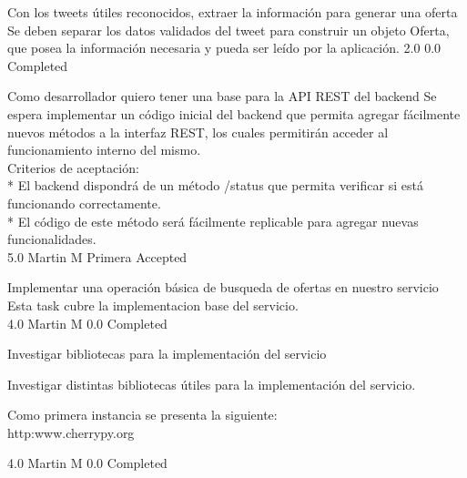 		{Con los tweets útiles reconocidos, extraer la información para generar una oferta} %
		{Se deben separar los datos validados del tweet para construir un objeto
Oferta, que posea la información necesaria y pueda ser leído por la
aplicación.
} %
		{2.0} %
		{} %
		{0.0} %
		{Completed} %


\vspace{20pt}

	{Como desarrollador quiero tener una base para la API REST del backend} %
	{Se espera implementar un código inicial del backend que permita agregar
fácilmente nuevos métodos a la interfaz REST, los cuales permitirán acceder al
funcionamiento interno del mismo.
  \\
Criterios de aceptación:\\
* El backend dispondrá de un método /status que permita verificar si está funcionando correctamente.   \\
* El código de este método será fácilmente replicable para agregar nuevas funcionalidades.\\
} %
	{} %
	{5.0} %
	{Martin M} %
	{Primera} %
	{Accepted} %

		{Implementar una operación básica de busqueda de ofertas en nuestro servicio} %
		{Esta task cubre la implementacion base del servicio.\\
} %
		{4.0} %
		{Martin M} %
		{0.0} %
		{Completed} %

		{Investigar bibliotecas para la implementación del servicio} %
		{Investigar distintas bibliotecas útiles para la implementación del servicio.
		
Como primera instancia se presenta la siguiente:
  \\
http:\/\/www.cherrypy.org\/
} %
		{4.0} %
		{Martin M} %
		{0.0} %
		{Completed} %


\vspace{20pt}

